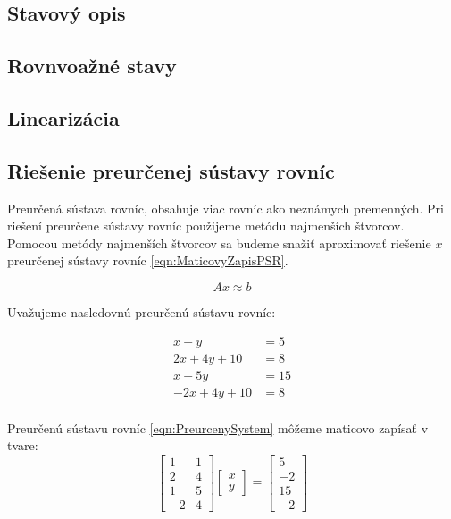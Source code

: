 \documentclass[../main.tex]{subfiles}
\begin{document}
\subsection{Stavový opis}
	
\subsection{Rovnvoažné stavy}
	
\subsection{Linearizácia}
	
\subsection{Riešenie preurčenej sústavy rovníc}

Preurčená sústava rovníc, obsahuje viac rovníc ako neznámych premenných. Pri riešení preurčene sústavy rovníc použijeme metódu najmenších štvorcov. Pomocou metódy najmenších štvorcov sa budeme snažiť aproximovať riešenie $x$ preurčenej sústavy rovníc \ref{eqn:MaticovyZapisPSR}.

\begin{equation}
	Ax \approx b
	\label{eqn:MaticovyZapisPSR}
\end{equation}

Uvažujeme nasledovnú preurčenú sústavu rovníc:

\begin{equation}
	\begin{split}
	 x+y  & = 5 \\
	 2x+4y+10 & = 8 \\
	 x+5y & = 15 \\
	 -2x+4y+10 & = 8 \\
	\end{split}
	\label{eqn:PreurcenySystem}
\end{equation}

Preurčenú sústavu rovníc \ref{eqn:PreurcenySystem} môžeme maticovo zapísať v tvare:
\begin{equation}
\begin{bmatrix} 1 & 1\\ 2 & 4 \\1 &5 \\-2& 4\end{bmatrix}\begin{bmatrix}x \\y \end{bmatrix} = \begin{bmatrix} 5 \\-2\\15\\-2 \end{bmatrix}
 \label{eqn:MaticovyZapisPiklad}
\end{equation}
\end{document}
